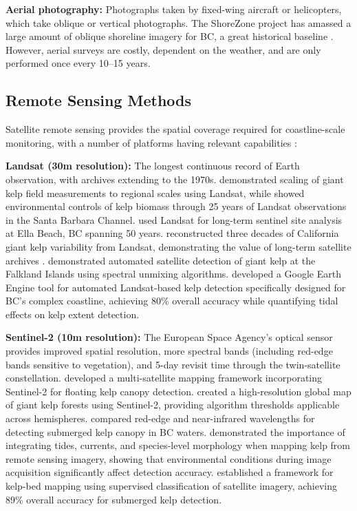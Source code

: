 \documentclass[12pt,oneside]{book}
\begin{document}
\textbf{Aerial photography:} Photographs taken by fixed-wing aircraft or helicopters, which take oblique or vertical photographs. The ShoreZone project has amassed a large amount of oblique shoreline imagery for BC, a great historical baseline \citep{Starko2024}. However, aerial surveys are costly, dependent on the weather, and are only performed once every 10--15 years.

\subsection{Remote Sensing Methods}
\label{subsec:remote-sensing}

Satellite remote sensing provides the spatial coverage required for coastline-scale monitoring, with a number of platforms having relevant capabilities \citep{Bennion2019, Cavanaugh2021}:

\textbf{Landsat (30m resolution):} The longest continuous record of Earth observation, with archives extending to the 1970s. \citet{Cavanaugh2010} demonstrated scaling of giant kelp field measurements to regional scales using Landsat, while \citet{Cavanaugh2011} showed environmental controls of kelp biomass through 25 years of Landsat observations in the Santa Barbara Channel. \citet{MoraSoto2024} used Landsat for long-term sentinel site analysis at Ella Beach, BC spanning 50 years. \citet{Bell2020} reconstructed three decades of California giant kelp variability from Landsat, demonstrating the value of long-term satellite archives \citep{Finger2021, Hamilton2020}. \citet{Houskeeper2022} demonstrated automated satellite detection of giant kelp at the Falkland Islands using spectral unmixing algorithms. \citet{Nijland2019} developed a Google Earth Engine \citep{Gorelick2017} tool for automated Landsat-based kelp detection specifically designed for BC's complex coastline, achieving 80\% overall accuracy while quantifying tidal effects on kelp extent detection.

\textbf{Sentinel-2 (10m resolution):} The European Space Agency's optical sensor provides improved spatial resolution, more spectral bands (including red-edge bands sensitive to vegetation), and 5-day revisit time through the twin-satellite constellation. \citet{Gendall2023} developed a multi-satellite mapping framework incorporating Sentinel-2 for floating kelp canopy detection. \citet{MoraSoto2020} created a high-resolution global map of giant kelp forests using Sentinel-2, providing algorithm thresholds applicable across hemispheres. \citet{Timmer2022} compared red-edge and near-infrared wavelengths for detecting submerged kelp canopy in BC waters. \citet{Timmer2024} demonstrated the importance of integrating tides, currents, and species-level morphology when mapping kelp from remote sensing imagery, showing that environmental conditions during image acquisition significantly affect detection accuracy. \citet{StPierre2020} established a framework for kelp-bed mapping using supervised classification of satellite imagery, achieving 89\% overall accuracy for submerged kelp detection.
\end{document}
